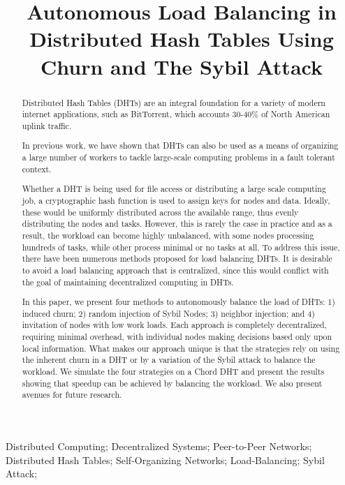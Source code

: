 \documentclass[11pt,conference]{IEEEtran}
\title{Autonomous Load Balancing in Distributed Hash Tables Using Churn and The Sybil Attack}
\author{\IEEEauthorblockN{Andrew Rosen \qquad Benjamin Levin \qquad Anu G. Bourgeois}
	\IEEEauthorblockA{ Department of Computer Science \\ Temple University \qquad Temple University \qquad Georgia State University \\ Philadelphia, PA \qquad Philadelphia, PA \qquad Atlanta, GA \\ andrew.rosen@temple.edu \qquad blevin@temple.edu \qquad abourgeois@gsu.edu }
}
\begin{document}
\maketitle

\begin{abstract}
Distributed Hash Tables (DHTs) are an integral foundation for a variety of modern internet applications, such as BitTorrent, which accounts 30-40\% of North American uplink traffic.

In previous work, we have shown that DHTs can also be used as a means of organizing a large number of workers to tackle large-scale computing problems in a fault tolerant context.

Whether a DHT is being used for file access or distributing a large scale computing job, a cryptographic hash function is used to assign keys for nodes and data. Ideally, these would be uniformly distributed across the available range, thus evenly distributing the nodes and tasks. However, this is rarely the case in practice and as a result, the workload can become highly unbalanced, with some nodes processing hundreds of tasks, while other process minimal or no tasks at all. To address this issue, there have been numerous methods proposed for load balancing DHTs. It is desirable to avoid a load balancing approach that is centralized, since this would conflict with the goal of maintaining decentralized computing in DHTs.

In this paper, we present four methods to autonomously balance the load of DHTs: 1) induced churn; 2) random injection of Sybil Nodes; 3) neighbor injection; and 4) invitation of nodes with low work loads. Each approach is completely decentralized, requiring minimal overhead, with individual nodes making decisions based only upon local information. What makes our approach unique is that the strategies rely on using the inherent churn in a DHT or by a variation of the Sybil attack to balance the workload. We simulate the four strategies on a Chord DHT and present the results showing that speedup can be achieved by balancing the workload. We also present avenues for future research.
\end{abstract}


\begin{IEEEkeywords}
	Distributed Computing; Decentralized Systems; Peer-to-Peer Networks;  Distributed Hash Tables; Self-Organizing Networks; Load-Balancing; Sybil Attack;
	
\end{IEEEkeywords}
\end{document}
